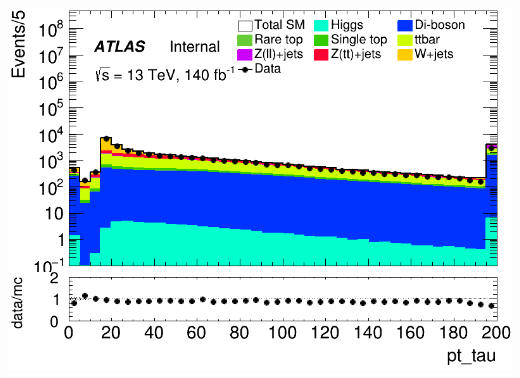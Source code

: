 \documentclass[usenames,dvipsnames]{beamer}
\begin{document}
\begin{frame}
\begin{minipage}{0.32\textwidth}
        \includegraphics[width=\textwidth]{graphics/L_met/L_met_pt_tau.png}
    \end{minipage}
    
    \vspace{0.5cm} %
\end{frame}
\end{document}
